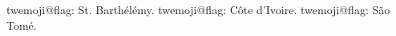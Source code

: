 \documentclass{article}
\makeatletter
\def\twemoji#1{\csname twemoji@#1\endcsname}
\makeatother
\begin{document}
\twemoji{flag: St. Barth\'el\'emy}.
\twemoji{flag: C\^ote d\textquoteright Ivoire}.
\twemoji{flag: S\~ao Tom\'e}.
\end{document}
